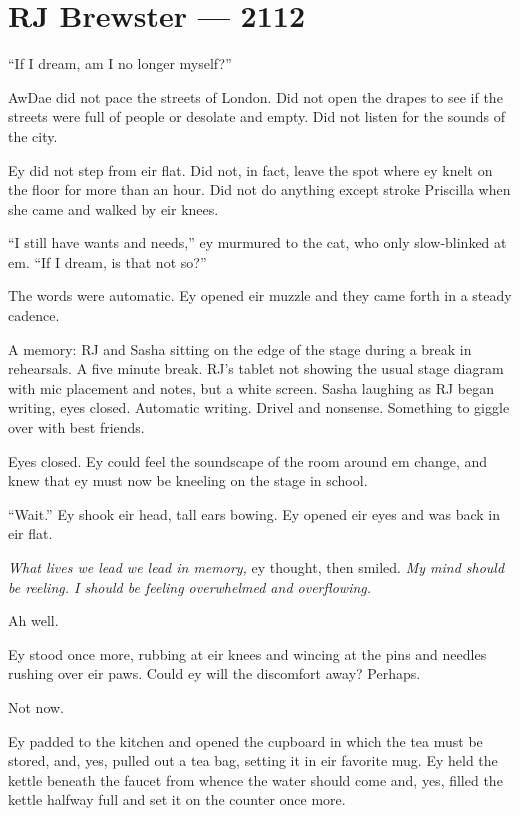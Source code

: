 \hypertarget{rj-brewster-2112}{%
\chapter*{RJ Brewster — 2112}\label{rj-brewster-2112}}

``If I dream, am I no longer myself?''

AwDae did not pace the streets of London. Did not open the drapes to see if the streets were full of people or desolate and empty. Did not listen for the sounds of the city.

Ey did not step from eir flat. Did not, in fact, leave the spot where ey knelt on the floor for more than an hour. Did not do anything except stroke Priscilla when she came and walked by eir knees.

``I still have wants and needs,'' ey murmured to the cat, who only slow-blinked at em. ``If I dream, is that not so?''

The words were automatic. Ey opened eir muzzle and they came forth in a steady cadence.

A memory: RJ and Sasha sitting on the edge of the stage during a break in rehearsals. A five minute break. RJ's tablet not showing the usual stage diagram with mic placement and notes, but a white screen. Sasha laughing as RJ began writing, eyes closed. Automatic writing. Drivel and nonsense. Something to giggle over with best friends.

Eyes closed. Ey could feel the soundscape of the room around em change, and knew that ey must now be kneeling on the stage in school.

``Wait.'' Ey shook eir head, tall ears bowing. Ey opened eir eyes and was back in eir flat.

\emph{What lives we lead we lead in memory,} ey thought, then smiled. \emph{My mind should be reeling. I should be feeling overwhelmed and overflowing.}

Ah well.

Ey stood once more, rubbing at eir knees and wincing at the pins and needles rushing over eir paws. Could ey will the discomfort away? Perhaps.

Not now.

Ey padded to the kitchen and opened the cupboard in which the tea must be stored, and, yes, pulled out a tea bag, setting it in eir favorite mug. Ey held the kettle beneath the faucet from whence the water should come and, yes, filled the kettle halfway full and set it on the counter once more.

